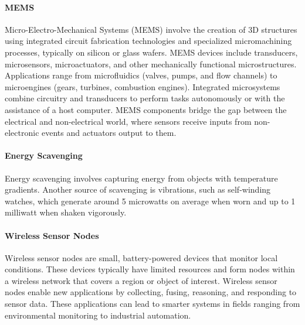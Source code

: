 \paragraph*{MEMS}
Micro-Electro-Mechanical Systems (MEMS) involve the creation of 3D structures using integrated circuit fabrication technologies and specialized micromachining processes, typically on silicon or glass wafers. 
MEMS devices include transducers, microsensors, microactuators, and other mechanically functional microstructures. 
Applications range from microfluidics (valves, pumps, and flow channels) to microengines (gears, turbines, combustion engines).
Integrated microsystems combine circuitry and transducers to perform tasks autonomously or with the assistance of a host computer.
MEMS components bridge the gap between the electrical and non-electrical world, where sensors receive inputs from non-electronic events and actuators output to them.

\paragraph*{Energy Scavenging}
Energy scavenging involves capturing energy from objects with temperature gradients. 
Another source of scavenging is vibrations, such as self-winding watches, which generate around 5 microwatts on average when worn and up to 1 milliwatt when shaken vigorously.

\paragraph*{Wireless Sensor Nodes}
Wireless sensor nodes are small, battery-powered devices that monitor local conditions.
These devices typically have limited resources and form nodes within a wireless network that covers a region or object of interest. 
Wireless sensor nodes enable new applications by collecting, fusing, reasoning, and responding to sensor data. 
These applications can lead to smarter systems in fields ranging from environmental monitoring to industrial automation.